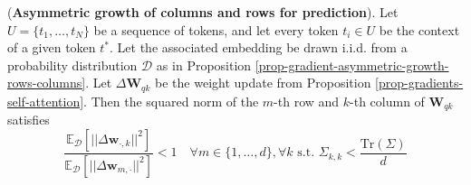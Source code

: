 \begin{corollary}
\label{corollary-gradient-asymmetric-growth-rows-columns}
%
(\textbf{Asymmetric growth of columns and rows for prediction}).
%
%
Let $U = \{t_1, \dots, t_N\}$ be a sequence of tokens, and let every token $t_i \in U$ be the context of a given token $t^*$.
%
Let the associated embedding be drawn i.i.d. from a probability distribution $\mathcal{D}$ as in Proposition \ref{prop-gradient-asymmetric-growth-rows-columns}.
%
Let $\Delta \bm{W}_{qk}$ be the weight update from Proposition \ref{prop-gradients-self-attention}.
%
Then the squared norm of the $m$-th row and $k$-th column of $\bm{W}_{qk}$ satisfies
%
\begin{equation}
\frac{\mathbb{E}_{\mathcal{D}}\left[ ||\Delta \bm{w}_{\cdot, k}||^2 \right]}{\mathbb{E}_{\mathcal{D}}\left[ ||\Delta \bm{w}_{m, \cdot}||^2 \right]} < 1 \quad \forall m \in \{1,\dots,d\}, \forall k \,\,\text{s.t.} \,\, \Sigma_{k,k} < \frac{\text{Tr}(\Sigma)}{d}
\end{equation}
%
\end{corollary}